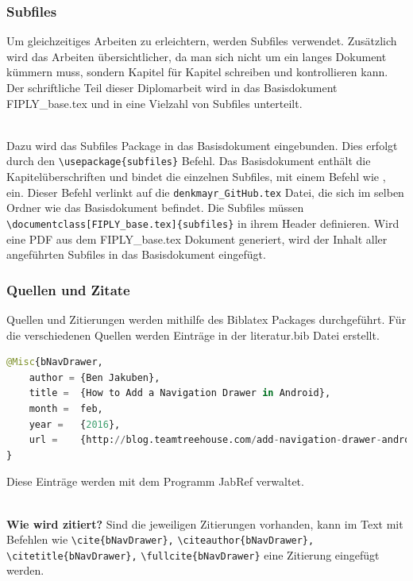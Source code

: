 \documentclass[FIPLY_base.tex]{subfiles}
\begin{document}
\subsubsection{Subfiles}
Um gleichzeitiges Arbeiten zu erleichtern, werden Subfiles verwendet.
Zusätzlich wird das Arbeiten übersichtlicher, da man sich nicht um ein langes Dokument kümmern muss, sondern Kapitel für Kapitel schreiben und kontrollieren kann.
Der schriftliche Teil dieser Diplomarbeit wird in das Basisdokument FIPLY\_base.tex und in eine Vielzahl von Subfiles unterteilt.

\ \\
Dazu wird das Subfiles Package in das Basisdokument eingebunden.
Dies erfolgt durch den \verb!\usepackage{subfiles}! Befehl.
Das Basisdokument enthält die Kapitelüberschriften und bindet die einzelnen Subfiles, mit einem Befehl wie \verb!!, ein.
Dieser Befehl verlinkt auf die \verb!denkmayr_GitHub.tex! Datei, die sich im selben Ordner wie das Basisdokument befindet.
Die Subfiles müssen \verb!\documentclass[FIPLY_base.tex]{subfiles}! in ihrem Header definieren.
Wird eine PDF aus dem FIPLY\_base.tex Dokument generiert, wird der Inhalt aller angeführten Subfiles in das Basisdokument eingefügt.

\newpage
\subsubsection{Quellen und Zitate}
Quellen und Zitierungen werden mithilfe des Biblatex Packages durchgeführt.
Für die verschiedenen Quellen werden Einträge in der literatur.bib Datei erstellt.

\begin{lstlisting}[language=Python,frame=none, caption={Eintrag in die literatur.bib Datei},label=DescriptiveLabel]
@Misc{bNavDrawer,
	author = {Ben Jakuben},
	title =  {How to Add a Navigation Drawer in Android},
	month =  feb,
	year =   {2016},
	url =    {http://blog.teamtreehouse.com/add-navigation-drawer-android}
}
\end{lstlisting}
Diese Einträge werden mit dem Programm JabRef verwaltet.

\ \\
\textbf{Wie wird zitiert?} \newline
Sind die jeweiligen Zitierungen vorhanden, kann im Text mit Befehlen wie 
\verb!\cite{bNavDrawer},! \newline 
\verb!\citeauthor{bNavDrawer},! \newline 
\verb!\citetitle{bNavDrawer},! \newline
\verb!\fullcite{bNavDrawer}! \newline
eine Zitierung eingefügt werden. 
\end{document}
